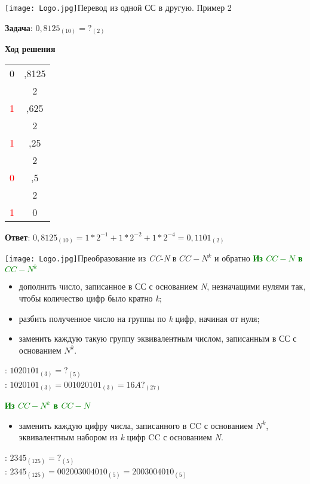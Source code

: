 \documentclass[11pt]{beamer}
\begin{document}
\begin{frame}{\texttt{[image: Logo.jpg]}Перевод из одной СС в другую. Пример 2}
\begin{minipage}{0.5\textwidth}
\textbf{Задача}: $0,8125_{(10)}=?_{(2)}$

\vspace{1cm}

\textbf{Ход решения \rightarrow}
\end{minipage}
\hfill
\begin{minipage}{0.45\textwidth}
\begin{tabular}{|c|c|}
     \hline
     0 & ,8125\\
       & 2\\
    \hline
    \textcolor{red}{1} & ,625\\
       & 2\\
    \hline
    \textcolor{red}{1} & ,25\\
       & 2\\
    \hline
    \textcolor{red}{0} & ,5\\
       & 2\\
    \hline
    \textcolor{red}{1} & 0\\
    \hline
\end{tabular}
\end{minipage}
\vspace{0.6cm}

\textbf{Ответ}: $0,8125_{(10)}=1*2^{-1}+1*2^{-2}+1*2^{-4}=0,1101_{(2)}$
\end{frame}

\begin{frame}{\texttt{[image: Logo.jpg]}Преобразование из \emph{CC}-\emph{N} в $CC-N^k$ и обратно}
\textbf{\textcolor{green}{Из $CC-N$ в $CC-N^k$}}
\begin{itemize}
    \item дополнить число, записанное в СС с основанием \emph{N}, незначащими нулями так, чтобы количество цифр было кратно \emph{k};
    \item разбить полученное число на группы по \emph{k} цифр, начиная от нуля;
    \item заменить каждую такую группу эквивалентным числом, записанным в СС с основанием $N^k$.
\end{itemize}\newline
\qquad{}: $1020101_{(3)}=?_{(5)}$\\
\qquad{}: $1020101_{(3)}=001020101_{(3)}=16A?_{(27)}$

\textbf{\textcolor{green}{Из $CC-N^k$ в $CC-N$}}
\begin{itemize}
    \item заменить каждую цифру числа, записанного в CC с основанием $N^k$, эквивалентным набором из \emph{k} цифр CC с основанием \emph{N}.
\end{itemize}
\qquad{}: $2345_{(125)}=?_{(5)}$\\
\qquad{}: $2345_{(125)}=002003004010_{(5)}=2003004010_{(5)}$
\end{frame}
\end{document}
